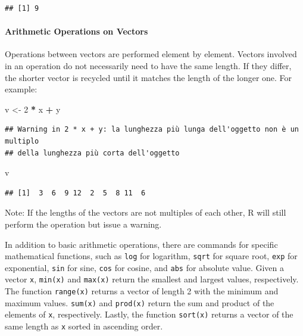 \documentclass[
]{article}
\newenvironment{Shaded}{\begin{snugshade}}{\end{snugshade}}
\newcommand{\DecValTok}[1]{\textcolor[rgb]{0.00,0.00,0.81}{#1}}
\newcommand{\NormalTok}[1]{#1}
\newcommand{\OtherTok}[1]{\textcolor[rgb]{0.56,0.35,0.01}{#1}}
\newcommand{\SpecialCharTok}[1]{\textcolor[rgb]{0.81,0.36,0.00}{\textbf{#1}}}
\begin{document}
\begin{verbatim}
## [1] 9
\end{verbatim}

\hypertarget{arithmetic-operations-on-vectors}{%
\paragraph{Arithmetic Operations on
Vectors}\label{arithmetic-operations-on-vectors}}

Operations between vectors are performed element by element. Vectors
involved in an operation do not necessarily need to have the same
length. If they differ, the shorter vector is recycled until it matches
the length of the longer one. For example:

\begin{Shaded}
\begin{Highlighting}[]
\NormalTok{v }\OtherTok{\textless{}{-}} \DecValTok{2} \SpecialCharTok{*}\NormalTok{ x }\SpecialCharTok{+}\NormalTok{ y}
\end{Highlighting}
\end{Shaded}

\begin{verbatim}
## Warning in 2 * x + y: la lunghezza più lunga dell'oggetto non è un multiplo
## della lunghezza più corta dell'oggetto
\end{verbatim}

\begin{Shaded}
\begin{Highlighting}[]
\NormalTok{v}
\end{Highlighting}
\end{Shaded}

\begin{verbatim}
## [1]  3  6  9 12  2  5  8 11  6
\end{verbatim}

Note: If the lengths of the vectors are not multiples of each other, R
will still perform the operation but issue a warning.

In addition to basic arithmetic operations, there are commands for
specific mathematical functions, such as \texttt{log} for logarithm,
\texttt{sqrt} for square root, \texttt{exp} for exponential,
\texttt{sin} for sine, \texttt{cos} for cosine, and \texttt{abs} for
absolute value. Given a vector \texttt{x}, \texttt{min(x)} and
\texttt{max(x)} return the smallest and largest values, respectively.
The function \texttt{range(x)} returns a vector of length 2 with the
minimum and maximum values. \texttt{sum(x)} and \texttt{prod(x)} return
the sum and product of the elements of \texttt{x}, respectively. Lastly,
the function \texttt{sort(x)} returns a vector of the same length as
\texttt{x} sorted in ascending order.
\end{document}
